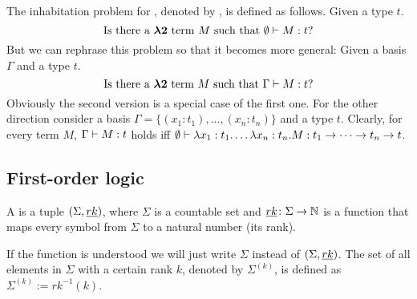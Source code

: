\begin{definition}\label{def.2.14}
The inhabitation problem for \lambdaTwo{}, denoted by \lambdaInhab, is defined as follows. Given a \lambdaTwo{} type $t$.
\[\text{Is there a \ensuremath{\boldsymbol{\lambda2}}{} term $M$ such that } \emptyset\vdash M:t?\]
But we can rephrase this problem so that it becomes more general:
Given a basis $\Gamma$ and a \lambdaTwo{} type $t$.
\[\text{Is there a \ensuremath{\boldsymbol{\lambda2}}{} term $M$ such that } \Gamma\vdash M:t?\]
Obviously the second version is a special case of the first one. For the other direction consider a basis $\Gamma=\{(x_1:t_1),\dots,(x_n:t_n)\}$ and a \lambdaTwo{} type $t$. Clearly, for every term $M$, $\Gamma\vdash M:t$ holds iff $\emptyset\vdash \lambda x_1:t_1.\dots\lambda x_n:t_n.M:t_1\to\dots\to t_n\to t$.
\end{definition}
\subsection{First-order logic}
\begin{definition}\label{def.2.15}
	A  is a tuple $(\Sigma,\emph{rk})$, where $\Sigma$ is a countable set and $\emph{rk}\colon\Sigma\to\mathbb{N}$ is a function that maps every symbol from $\Sigma$ to a natural number (its rank).
\end{definition}
If the function \rank{} is understood we will just write $\Sigma$ instead of $(\Sigma,\emph{rk})$. The set of all elements in $\Sigma$ with a certain rank $k$, denoted by $\Sigma^{(k)}$, is defined as $\Sigma^{(k)}:=rk^{-1}(k)$. 



